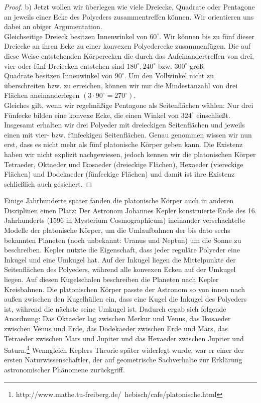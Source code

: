 \begin{proof}
b) Jetzt wollen wir überlegen wie viele Dreiecke, Quadrate oder Pentagone an jeweils einer Ecke des Polyeders zusammentreffen können. Wir orientieren uns dabei an obiger Argumentation.\\
Gleichseitige Dreieck besitzen Innenwinkel von $60^\circ$. Wir können bis zu fünf dieser Dreiecke an ihren Ecke zu einer konvexen Polyederecke zusammenfügen. Die auf diese Weise entstehenden Körperecken die durch das Aufeinandertreffen von drei, vier oder fünf Dreiecken entstehen sind  $180^\circ, 240^\circ$ bzw. $300^\circ$ groß.\\
Quadrate besitzen Innenwinkel von $90^\circ$. Um den Vollwinkel nicht zu überschreiten bzw. zu erreichen, können wir nur die Mindestanzahl von drei Flächen aneinanderlegen $(3\cdot90^\circ=270^\circ)$.\\
Gleiches gilt, wenn wir regelmäßige Pentagone als Seitenflächen wählen: Nur drei Fünfecke bilden eine konvexe Ecke, die einen Winkel von $324^\circ$ einschließt.\\
Insgesamt erhalten wir drei Polyeder mit dreieckigen Seitenflächen und jeweils einen mit vier- bzw. fünfeckigen Seitenflächen. Genau genommen wissen wir nun erst, dass es nicht mehr als fünf platonische Körper geben kann. Die Existenz haben wir nicht explizit nachgewiesen, jedoch kennen wir die platonischen Körper Tetraeder, Oktaeder und  Ikosaeder (dreieckige Flächen), Hexaeder (viereckige Flächen) und Dodekaeder (fünfeckige Flächen) und damit ist ihre Existenz schließlich auch gesichert. 
\end{proof}
Einige Jahrhunderte später fanden die platonische Körper auch in anderen Disziplinen einen Platz: 
Der Astronom Johannes Kepler konstruierte Ende des 16. Jahrhunderts (1596 in Mysterium Cosmographicum) ineinander verschachtelte Modelle der platonische Körper, um die Umlaufbahnen der bis dato sechs bekannten Planeten (noch unbekannt: Uranus und Neptun) um die Sonne zu beschreiben. Kepler nutzte die Eigenschaft, dass jeder reguläre Polyeder eine Inkugel und eine Umkugel hat. Auf der Inkugel liegen die Mittelpunkte der Seitenflächen des Polyeders, während alle konvexen Ecken auf der Umkugel liegen. Auf diesen Kugelschalen beschreiben die Planeten nach Kepler Kreisbahnen. Die platonischen Körper passte der Astronom so von innen nach außen zwischen den Kugelhüllen ein, dass eine Kugel die Inkugel des Polyeders ist, während die nächste seine Umkugel ist. Dadurch ergab sich folgende Anordnung: Das Oktaeder lag zwischen Merkur und Venus, das Ikosaeder zwischen Venus und Erde, das Dodekaeder zwischen Erde und Mars, das Tetraeder zwischen Mars und Jupiter und das Hexaeder zwischen Jupiter und Saturn.\footnote{http://www.mathe.tu-freiberg.de/~hebisch/cafe/platonische.html}  Wenngleich Keplers Theorie später widerlegt wurde, war er einer der ersten Naturwissenschaftler, der auf geometrische Sachverhalte zur Erklärung astronomischer Phänomene zurückgriff.\\
